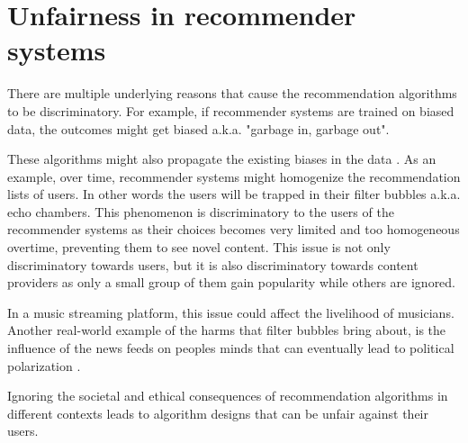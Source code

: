 \section{Unfairness in recommender systems}

There are multiple underlying reasons that cause the recommendation algorithms to be discriminatory. For example, if recommender systems are trained on biased data, the outcomes might get biased a.k.a. "garbage in, garbage out". 

These algorithms might also propagate the existing biases in the data \cite{barocas2016big}. As an example, over time, recommender systems might homogenize the recommendation lists of users. In other words the users will be trapped in their filter bubbles a.k.a. echo chambers. This phenomenon is discriminatory to the users of the recommender systems as their choices becomes very limited and too homogeneous overtime, preventing them to see novel content. This issue is not only discriminatory towards users, but it is also discriminatory towards content providers as only a small group of them gain popularity while others are ignored.

In a music streaming platform, this issue could affect the livelihood of musicians. Another real-world example of the harms that filter bubbles bring about, is the influence of the news feeds on peoples minds that can eventually lead to political polarization \cite{HONG2016777}.  


Ignoring the societal and ethical consequences of recommendation algorithms in different contexts leads to algorithm designs that can be unfair against their users.



    
    
    
